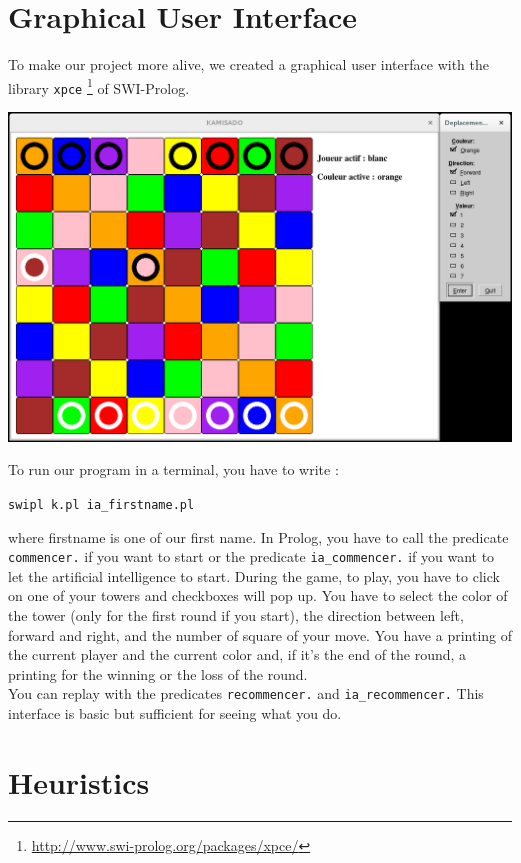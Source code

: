 \documentclass[a4paper, 11pt]{article}
\begin{document}
\section{Graphical User Interface}
To make our project more alive, we created a graphical user interface with the library \verb?xpce? \footnote{\url{http://www.swi-prolog.org/packages/xpce/}} of SWI-Prolog.\\
\begin{center}
\includegraphics[scale = 0.30]{kamisado.png}
\end{center}
To run our program in a terminal, you have to write :
\begin{center}
\verb?swipl k.pl ia_firstname.pl?
\end{center}
where firstname is one of our first name. 
In Prolog, you have to call the predicate \verb?commencer.? if you want to start or the predicate \verb?ia_commencer.? if you want to let the artificial intelligence to start.
During the game, to play, you have to click on one of your towers and checkboxes will pop up. You have to select the color of the tower (only for the first round if you start), the direction  between left, forward and right, and the number of square of your move.
You have a printing of the current player and the current color and, if it's the end of the round, a printing for the winning or the loss of the round.\\
You can replay with the predicates \verb?recommencer.? and \verb?ia_recommencer.?
This interface is basic but sufficient for seeing what you do.

\section{Heuristics}
\end{document}
